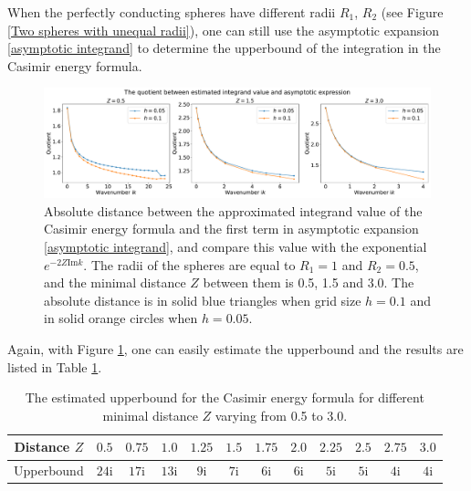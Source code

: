 When the perfectly conducting spheres have different radii $R_{1}$, $R_{2}$ (see Figure \ref{Two spheres with unequal radii}), one can still use the 
asymptotic expansion \eqref{asymptotic integrand} to determine the upperbound of the integration in the Casimir energy formula. 

    \begin{figure}[H]
        \centering
        \hspace*{-1.4cm}\includegraphics[scale = 0.37]{figures/rel_err_unequal.pdf}
        \caption{Absolute distance between the approximated integrand value of the Casimir energy formula and the first term in 
        asymptotic expansion \eqref{asymptotic integrand}, and compare this value with the exponential $e^{-2Z\text{Im}k}$. The radii of the spheres are equal to 
        $R_{1} = 1$ and $R_{2} = 0.5$, and the minimal distance $Z$ between them is 0.5, 1.5 and 3.0. The absolute distance is in solid blue triangles when grid size 
        $h = 0.1$ and in solid orange circles when $h = 0.05$.}
        \label{Abs unequal}
    \end{figure}

Again, with Figure \ref{Abs unequal}, one can easily estimate the upperbound and the results are listed in Table \ref{Unequal: distance and upperbound}.
\begin{table}[H]
    \centering
    \begin{tabular}{ |c|c|c|c|c|c|c|c|c|c|c|c| }
        \hline
        Distance $Z$ & $ 0.5$ & $ 0.75$  & $ 1.0$ & $1.25$ & $ 1.5$ & $1.75$  & $2.0$ & $2.25$ & $ 2.5$ & $ 2.75$  & $3.0$ \\\hline
        Upperbound & $24\mathrm{i}$ & $17\mathrm{i}$ & $13\mathrm{i}$ & $9\mathrm{i}$ & $7\mathrm{i}$ & $6\mathrm{i}$ & $6\mathrm{i}$ & $5\mathrm{i}$ & $5\mathrm{i}$ & $4\mathrm{i}$ & $4\mathrm{i}$ \\\hline
       \end{tabular}
       \caption{\label{Unequal: distance and upperbound} The estimated upperbound for the Casimir energy formula for different minimal distance $Z$ varying from 
       0.5 to 3.0.}
\end{table}

